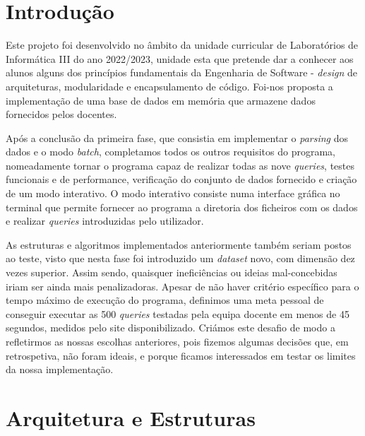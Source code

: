 \documentclass[12pt,a4paper]{report}
\begin{document}
    \chapter{Introdução}

    
    \par Este projeto foi desenvolvido no âmbito da unidade curricular de Laboratórios de Informática III do ano 2022/2023, unidade esta que pretende dar a conhecer aos alunos alguns dos princípios fundamentais da Engenharia de Software - \textit{design} de arquiteturas, modularidade e encapsulamento de código. Foi-nos proposta a implementação de uma base de dados em memória que armazene dados fornecidos pelos docentes. 
    \par Após a conclusão da primeira fase, que consistia em implementar o \textit{parsing} dos dados e o modo \textit{batch}, completamos todos os outros requisitos do programa, nomeadamente tornar o programa capaz de realizar todas as nove \textit{queries}, testes funcionais e de performance, verificação do conjunto de dados fornecido e criação de um modo interativo. O modo interativo consiste numa interface gráfica no terminal que permite fornecer ao programa a diretoria dos ficheiros com os dados e realizar \textit{queries} introduzidas pelo utilizador.
    \par As estruturas e algoritmos implementados anteriormente também seriam postos ao teste, visto que nesta fase foi introduzido um \textit{dataset} novo, com dimensão dez vezes superior. Assim sendo, quaisquer ineficiências ou ideias mal-concebidas iriam ser ainda mais penalizadoras. Apesar de não haver critério específico para o tempo máximo de execução do programa, definimos uma meta pessoal de conseguir executar as 500 \textit{queries} testadas pela equipa docente em menos de 45 segundos, medidos pelo site disponibilizado. Criámos este desafio de modo a refletirmos as nossas escolhas anteriores, pois fizemos algumas decisões que, em retrospetiva, não foram ideais, e porque ficamos interessados em testar os limites da nossa implementação.
 
\newpage
	
    \chapter{Arquitetura e Estruturas} 
    
\end{document}
